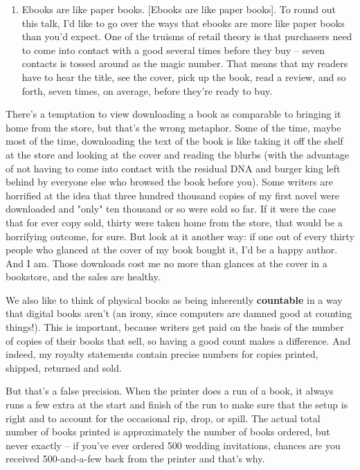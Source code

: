 \begin{enumerate}
\item
  Ebooks are like paper books. [Ebooks are like paper books]. To
  round out this talk, I'd like to go over the ways that ebooks are
  more like paper books than you'd expect. One of the truisms of
  retail theory is that purchasers need to come into contact with a
  good several times before they buy -- seven contacts is tossed
  around as the magic number. That means that my readers have to hear
  the title, see the cover, pick up the book, read a review, and so
  forth, seven times, on average, before they're ready to buy.
\end{enumerate}
There's a temptation to view downloading a book as comparable to
bringing it home from the store, but that's the wrong metaphor.
Some of the time, maybe most of the time, downloading the text of
the book is like taking it off the shelf at the store and looking
at the cover and reading the blurbs (with the advantage of not
having to come into contact with the residual DNA and burger king
left behind by everyone else who browsed the book before you). Some
writers are horrified at the idea that three hundred thousand
copies of my first novel were downloaded and "only" ten thousand or
so were sold so far. If it were the case that for ever copy sold,
thirty were taken home from the store, that would be a horrifying
outcome, for sure. But look at it another way: if one out of every
thirty people who glanced at the cover of my book bought it, I'd be
a happy author. And I am. Those downloads cost me no more than
glances at the cover in a bookstore, and the sales are healthy.

We also like to think of physical books as being inherently
\textbf{countable} in a way that digital books aren't (an irony,
since computers are damned good at counting things!). This is
important, because writers get paid on the basis of the number of
copies of their books that sell, so having a good count makes a
difference. And indeed, my royalty statements contain precise
numbers for copies printed, shipped, returned and sold.

But that's a false precision. When the printer does a run of a
book, it always runs a few extra at the start and finish of the run
to make sure that the setup is right and to account for the
occasional rip, drop, or spill. The actual total number of books
printed is approximately the number of books ordered, but never
exactly -- if you've ever ordered 500 wedding invitations, chances
are you received 500-and-a-few back from the printer and that's
why.

